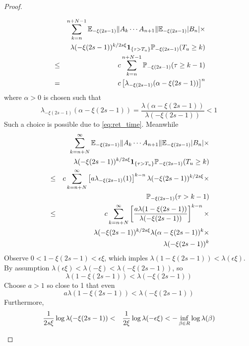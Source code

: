 \documentclass{article}
\begin{document}
\begin{proof}
\begin{enumerate}
\begin{enumerate}
\begin{enumerate}
\begin{eqnarray*}
        && \sum_{k=n}^{n+N-1} \mathbb{E}_{-\xi(2s - 1)}\|A_k \cdots A_{n+1}\|
        \mathbb{E}_{-\xi(2s - 1)}|B_n| \times \\
        && \lambda(-\xi(2s - 1))^{k/2s\xi} \mathbf{1}_{\{\tau > T_u\}}
        \mathbb{P}_{-\xi(2s - 1)}(T_u \geq k) \\
        &\leq& c \sum_{k=n}^{n+N-1} \mathbb{P}_{-\xi(2s - 1)}(\tau \geq k-1)
        \\
        &=& c \left[ \lambda_{-\xi(2s - 1)}(\alpha - \xi(2s - 1)) \right]^n
      \end{eqnarray*}
      where $\alpha > 0$ is chosen such that
      \[
      \lambda_{-\xi(2s - 1)}(\alpha - \xi(2s - 1)) = \frac{
        \lambda(\alpha - \xi(2s - 1))
      }{
        \lambda(-\xi(2s - 1))
      } < 1
      \]
      Such a choice is possible due to \eqref{eq:ret_time}. Meanwhile
      \begin{eqnarray*}
        && \sum_{k=n+N}^{\infty} \mathbb{E}_{-\xi(2s - 1)}\|A_k \cdots A_{n+1}\|
        \mathbb{E}_{-\xi(2s - 1)}|B_n| \times \\
        && \lambda(-\xi(2s - 1))^{k/2s\xi} \mathbf{1}_{\{\tau > T_u\}}
        \mathbb{P}_{-\xi(2s - 1)}(T_u \geq k) \\
        &\leq& c \sum_{k=n+N}^{\infty} \left[
          a \lambda_{-\xi(2s - 1)}(1) \right]^{k-n} \lambda(-\xi(2s -
        1))^{k/2s\xi} \times \\
        && \mathbb{P}_{-\xi(2s - 1)}(\tau > k-1) \\
        &\leq& c \sum_{k=n+N}^\infty \left[
          \frac{
            a\lambda(1-\xi(2s - 1))
          }{
            \lambda(-\xi(2s - 1))
          }
        \right]^{k-n} \times \\
        && \lambda(-\xi(2s - 1))^{k/2s\xi}
        \lambda(\alpha - \xi(2s - 1))^k \times \\
        && \lambda(-\xi(2s - 1))^k
      \end{eqnarray*}
      Observe $0 < 1 - \xi(2s - 1) < \epsilon \xi$, which imples
      $\lambda(1 - \xi(2s - 1)) < \lambda(\epsilon \xi)$. By
      assumption $\lambda(\epsilon \xi) < \lambda(-\xi) <
      \lambda(-\xi(2s - 1))$, so
      \[
      \lambda(1 - \xi(2s - 1)) < \lambda(-\xi(2s - 1))
      \]
      Choose $a > 1$ so close to 1 that even
      \[
      a \lambda(1 - \xi(2s - 1)) < \lambda(-\xi(2s - 1))
      \]
      Furthermore,
      \begin{eqnarray*}
        {1 \over 2s\xi} \log \lambda(-\xi(2s - 1)) &<& {1 \over 2\xi}
        \log \lambda(-\epsilon \xi) < - \inf_{\beta \in R} \log
        \lambda(\beta)
      \end{eqnarray*}

\end{enumerate}
\end{enumerate}
\end{enumerate}
\end{proof}
\end{document}

